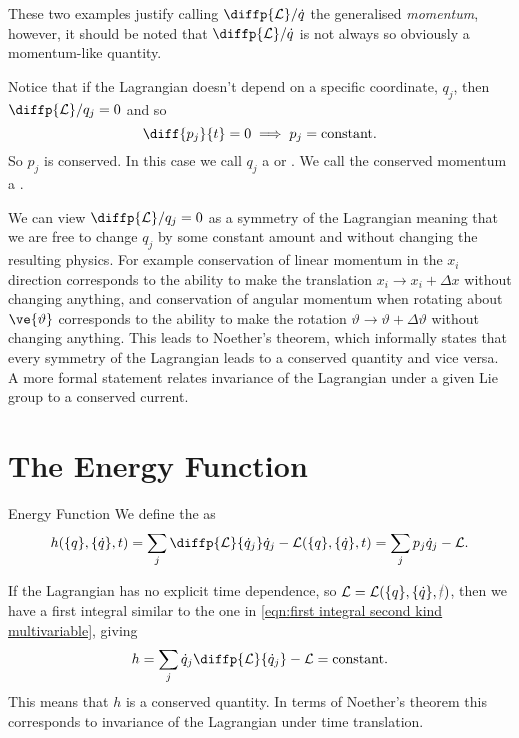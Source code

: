 \documentclass[fleqn]{NotesClass}
\newcommand*{\nodependence}[1]{\textcolor{gray}{\cancel{#1}}}
\newcommand*{\lagrangian}{\mathcal{L}}
\begin{document}
    These two examples justify calling \(\diffp{\lagrangian}/{\dot{q}}\) the generalised \emph{momentum}, however, it should be noted that \(\diffp{\lagrangian}/{\dot{q}}\) is not always so obviously a momentum-like quantity.
    
    Notice that if the Lagrangian doesn't depend on a specific coordinate, \(q_j\), then \(\diffp{\lagrangian}/{q_j} = 0\) and so
    \begin{equation}
        \diff{p_j}{t} = 0 \implies p_j = \mathrm{constant}.
    \end{equation}
    So \(p_j\) is conserved.
    In this case we call \(q_j\) a  or .
    We call the conserved momentum a .
    
    We can view \(\diffp{\lagrangian}/{q_j} = 0\) as a symmetry of the Lagrangian meaning that we are free to change \(q_j\) by some constant amount and without changing the resulting physics.
    For example conservation of linear momentum in the \(x_i\) direction corresponds to the ability to make the translation \(x_i \to x_i + \Delta x\) without changing anything, and conservation of angular momentum when rotating about \(\ve{\vartheta}\) corresponds to the ability to make the rotation \(\vartheta \to \vartheta + \Delta \vartheta\) without changing anything.
    This leads to Noether's theorem, which informally states that every symmetry of the Lagrangian leads to a conserved quantity and vice versa.
    A more formal statement relates invariance of the Lagrangian under a given Lie group to a conserved current.
    
    \section{The Energy Function}
    \begin{dfn}{Energy Function}{}
        We define the  as
        \begin{equation}
            h(\{q\}, \{\dot{q}\}, t) = \sum_{j} \diffp{\lagrangian}{\dot{q}_j}\dot{q}_j - \lagrangian(\{q\}, \{\dot{q}\}, t) = \sum_{j} p_j\dot{q}_j - \lagrangian.
        \end{equation}
    \end{dfn}
    
    If the Lagrangian has no explicit time dependence, so \(\lagrangian = \lagrangian(\{q\}, \{\dot{q}\}, \nodependence{t})\), then we have a first integral similar to the one in \cref{eqn:first integral second kind multivariable}, giving
    \begin{equation}
        h = \sum_{j}\dot{q}_j\diffp{\lagrangian}{\dot{q}_j} - \lagrangian = \text{constant}.
    \end{equation}
    This means that \(h\) is a conserved quantity.
    In terms of Noether's theorem this corresponds to invariance of the Lagrangian under time translation.
    
\end{document}
